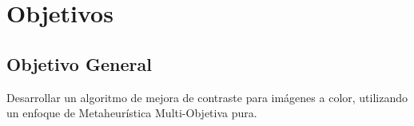 


\section{Objetivos}
\subsection{Objetivo General}
Desarrollar un algoritmo de mejora de contraste para imágenes a color, utilizando un enfoque de Metaheurística Multi-Objetiva pura. 

